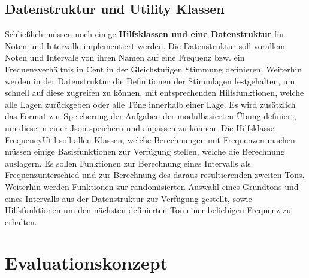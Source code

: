 \subsection{Datenstruktur und Utility Klassen}
Schließlich müssen noch einige \textbf{Hilfsklassen und eine Datenstruktur} für Noten und Intervalle implementiert werden. Die Datenstruktur soll vorallem Noten und Intervale von ihren Namen auf eine Frequenz bzw. ein Frequenzverhältnis in Cent in der Gleichstufigen Stimmung definieren. Weiterhin werden in der Datenstruktur die Definitionen der Stimmlagen festgehalten, um schnell auf diese zugreifen zu können, mit entsprechenden Hilfsfunktionen, welche alle Lagen zurückgeben oder alle Töne innerhalb einer Lage. Es wird zusätzlich das Format zur Speicherung der Aufgaben der modulbasierten Übung definiert, um diese in einer Json speichern und anpassen zu können.
Die Hilfsklasse FrequencyUtil soll allen Klassen, welche Berechnungen mit Frequenzen machen müssen einige Basisfunktionen zur Verfügung stellen, welche die Berechnung auslagern. Es sollen Funktionen zur Berechnung eines Intervalls als Frequenzunterschied und zur Berechnung des daraus resultierenden zweiten Tons. Weiterhin werden Funktionen zur randomisierten Auswahl eines Grundtons und eines Intervalls aus der Datenstruktur zur Verfügung gestellt, sowie Hilfsfunktionen um den nächsten definierten Ton einer beliebigen Frequenz zu erhalten.


\section{Evaluationskonzept}
    
